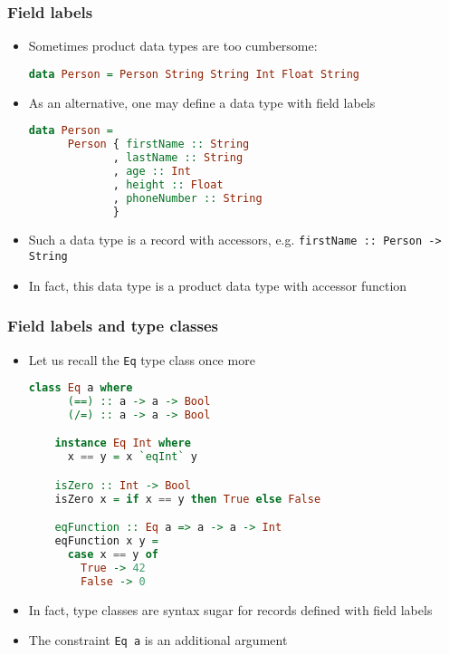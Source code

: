 \documentclass[10pt,pdf,utf8,russian,aspectratio=169]{beamer}
\begin{document}
\begin{frame}[fragile]
  \frametitle{Field labels}

  \begin{itemize}
    \item Sometimes product data types are too cumbersome:
    \begin{lstlisting}[language=Haskell]
    data Person = Person String String Int Float String
    \end{lstlisting}
    \item As an alternative, one may define a data type with field labels
    \begin{lstlisting}[language=Haskell]
    data Person =
      Person { firstName :: String
             , lastName :: String
             , age :: Int
             , height :: Float
             , phoneNumber :: String
             }
     \end{lstlisting}
     \item Such a data type is a record with accessors, e.g.
     \verb"firstName :: Person -> String"
     \item In fact, this data type is a product data type with accessor function
  \end{itemize}
\end{frame}

\begin{frame}[fragile]
  \frametitle{Field labels and type classes}

  \begin{itemize}
    \item Let us recall the \verb"Eq" type class once more
    \begin{lstlisting}[language=Haskell]
    class Eq a where
      (==) :: a -> a -> Bool
      (/=) :: a -> a -> Bool

    instance Eq Int where
      x == y = x `eqInt` y

    isZero :: Int -> Bool
    isZero x = if x == y then True else False

    eqFunction :: Eq a => a -> a -> Int
    eqFunction x y =
      case x == y of
        True -> 42
        False -> 0
    \end{lstlisting}
    \item In fact, type classes are syntax sugar for records defined with field labels
    \item The constraint \verb"Eq a" is an additional argument
  \end{itemize}
\end{frame}
\end{document}
